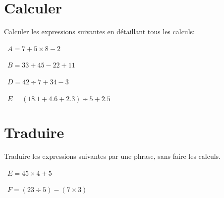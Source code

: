 
\section{Calculer}
Calculer les expressions suivantes en détaillant tous les calculs:
\begin{questions}
	
	
	\question[3]  $A = 7 + 5 \times 8 - 2$
	
	\fillwithdottedlines{6cm}
	
	\question[3]  $B = 33 + 45 - 22 + 11$
	
	\fillwithdottedlines{6cm}
	
	\newpage
	
%	
	
	
	
	\question[4]  $D = 42 \div 7 + 34 - 3$
	
	\fillwithdottedlines{5.5cm}
	
	\question[4]  $E = (\num{18.1} + \num{4.6} + \num{2.3}) \div 5 + \num{2.5}$
	
	\fillwithdottedlines{5.5cm}
	
\end{questions}

	\section{Traduire}
Traduire les expressions suivantes par une phrase, sans faire les calculs.
\begin{questions}
	
	\question[3]  $E = 45 \times 4 + 5$
	\fillwithdottedlines{3cm}
	
	
	\question[3]  $F = (23 \div 5) - (7 \times 3)$
	\fillwithdottedlines{3cm}
	
\end{questions}


